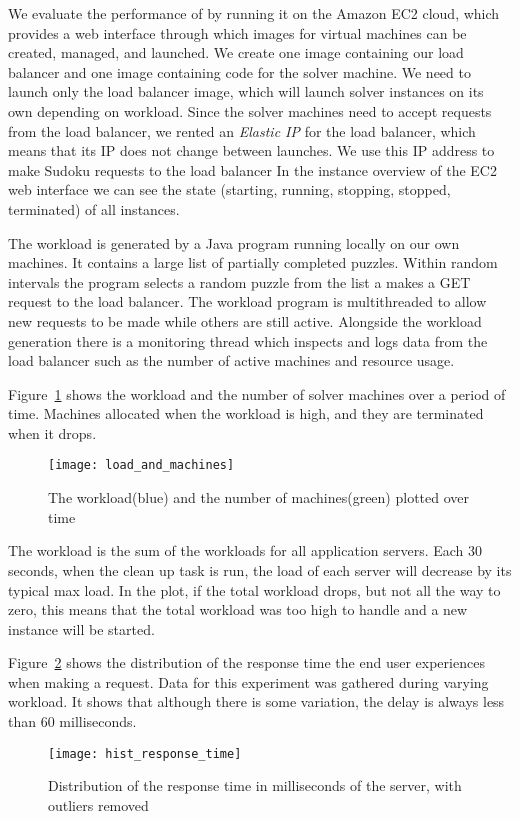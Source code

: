 We evaluate the performance of \appName{} by running it on the Amazon EC2 cloud, which provides a web interface through which images for virtual machines can be created, managed, and launched.
We create one image containing our load balancer and one image containing code for the solver machine.
We need to launch only the load balancer image, which will launch solver instances on its own depending on workload.
Since the solver machines need to accept requests from the load balancer, we rented an \textit{Elastic IP} for the load balancer, which means that its IP does not change between launches.
We use this IP address to make Sudoku requests to the load balancer
In the instance overview of the EC2 web interface we can see the state (starting, running, stopping, stopped, terminated) of all instances.

The workload is generated by a Java program running locally on our own machines.
It contains a large list of partially completed puzzles.
Within random intervals the program selects a random puzzle from the list a makes a GET request to the load balancer.   
The workload program is multithreaded to allow new requests to be made while others are still active.
Alongside the workload generation there is a monitoring thread which inspects and logs data from the load balancer such as the number of active machines and resource usage.

Figure~\ref{fig:exp:load} shows the workload and the number of solver machines over a period of time.
Machines allocated when the workload is high, and they are terminated when it drops. 

\begin{figure}[H]
	\texttt{[image: load\_and\_machines]}
	\caption{The workload(blue) and the number of machines(green) plotted over time}
	\label{fig:exp:load}
\end{figure}

The workload is the sum of the workloads for all application servers.
Each 30 seconds, when the clean up task is run, the load of each server will decrease by its typical max load.
In the plot, if the total workload drops, but not all the way to zero, this means that the total workload was too high to handle and a new instance will be started.

Figure~\ref{fig:exp:response} shows the distribution of the response time the end user experiences when making a request. Data for this experiment was gathered during varying workload. It shows that although there is some variation, the delay is always less than 60 milliseconds.

\begin{figure}[H]
	\texttt{[image: hist\_response\_time]}
	\caption{Distribution of the response time in milliseconds of the server, with outliers removed}
	\label{fig:exp:response}
\end{figure}
